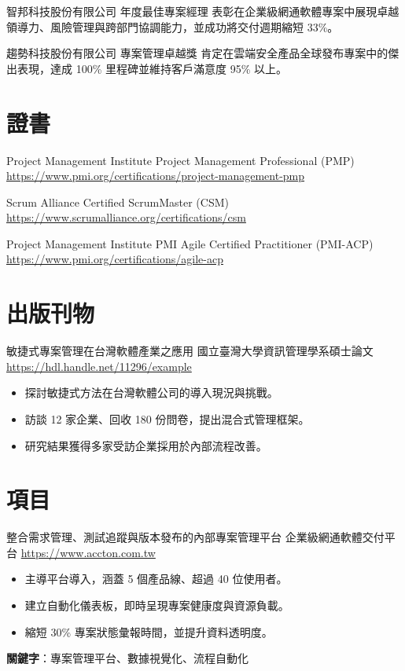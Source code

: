 \documentclass[a4paper, serif, 10pt]{moderncv}
\begin{document}
        {智邦科技股份有限公司}
        {年度最佳專案經理}
        {}
        {}
        {表彰在企業級網通軟體專案中展現卓越領導力、風險管理與跨部門協調能力，並成功將交付週期縮短 33\%。}

        {趨勢科技股份有限公司}
        {專案管理卓越獎}
        {}
        {}
        {肯定在雲端安全產品全球發布專案中的傑出表現，達成 100\% 里程碑並維持客戶滿意度 95\% 以上。}
\section{證書}

        {Project Management Institute}
        {Project Management Professional (PMP)}
        {\url{https://www.pmi.org/certifications/project-management-pmp}}
        {}
        {}

        {Scrum Alliance}
        {Certified ScrumMaster (CSM)}
        {\url{https://www.scrumalliance.org/certifications/csm}}
        {}
        {}

        {Project Management Institute}
        {PMI Agile Certified Practitioner (PMI-ACP)}
        {\url{https://www.pmi.org/certifications/agile-acp}}
        {}
        {}
\section{出版刊物}

        {敏捷式專案管理在台灣軟體產業之應用}
        {國立臺灣大學資訊管理學系碩士論文}
        {\url{https://hdl.handle.net/11296/example}}
        {}
        {\begin{itemize}
\item 探討敏捷式方法在台灣軟體公司的導入現況與挑戰。
\item 訪談 12 家企業、回收 180 份問卷，提出混合式管理框架。
\item 研究結果獲得多家受訪企業採用於內部流程改善。
\end{itemize}}
\section{項目}

        {整合需求管理、測試追蹤與版本發布的內部專案管理平台}
        {企業級網通軟體交付平台}
        {\url{https://www.accton.com.tw}}
        {}
        {\begin{itemize}
\item 主導平台導入，涵蓋 5 個產品線、超過 40 位使用者。
\item 建立自動化儀表板，即時呈現專案健康度與資源負載。
\item 縮短 30\% 專案狀態彙報時間，並提升資料透明度。
\end{itemize}
\textbf{關鍵字}：專案管理平台、數據視覺化、流程自動化}
\end{document}
